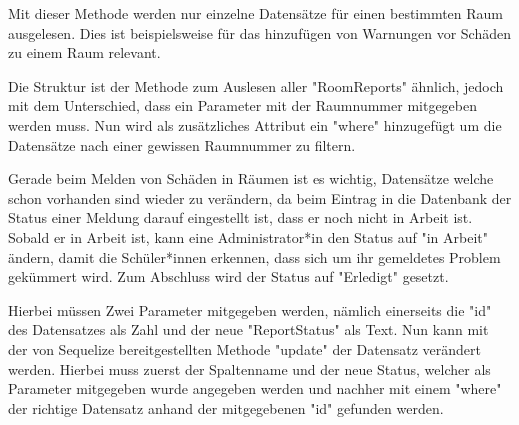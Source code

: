 Mit dieser Methode werden nur einzelne Datensätze für einen bestimmten Raum ausgelesen. Dies ist beispielsweise für das hinzufügen von Warnungen vor Schäden zu einem Raum relevant. 

Die Struktur ist der Methode zum Auslesen aller "RoomReports" ähnlich, jedoch mit dem Unterschied, dass ein Parameter mit der Raumnummer mitgegeben werden muss. Nun wird als zusätzliches Attribut ein "where" hinzugefügt um die Datensätze nach einer gewissen Raumnummer zu filtern.



Gerade beim Melden von Schäden in Räumen ist es wichtig, Datensätze welche schon vorhanden sind wieder zu verändern, da beim Eintrag in die Datenbank der Status einer Meldung darauf eingestellt ist, dass er noch nicht in Arbeit ist. Sobald er in Arbeit ist, kann eine Administrator*in den Status auf "in Arbeit" ändern, damit die Schüler*innen erkennen, dass sich um ihr gemeldetes Problem gekümmert wird. Zum Abschluss wird der Status auf "Erledigt" gesetzt.

Hierbei müssen Zwei Parameter mitgegeben werden, nämlich einerseits die "id" des Datensatzes als Zahl und der neue "ReportStatus" als Text. Nun kann mit der von Sequelize bereitgestellten Methode "update" der Datensatz verändert werden. Hierbei muss zuerst der Spaltenname und der neue Status, welcher als Parameter mitgegeben wurde angegeben werden und nachher mit einem "where" der richtige Datensatz anhand der mitgegebenen "id" gefunden werden.
